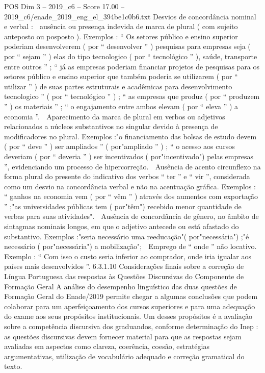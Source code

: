 \begin{textsample}{POS Dim 3 – 2019\_c6 – Score 17.00 – 2019\_c6/enade\_2019\_eng\_el\_394be1c0b6.txt}
Desvios de concordância nominal e verbal :  ausência ou presença indevida de marca de plural ( com sujeito anteposto ou posposto ).
Exemplos : “ Os setores público e ensino superior poderiam desenvolverem ( por “ desenvolver ” ) pesquisas para empresas seja ( por “ sejam ” ) elas do tipo tecnologico ( por “ tecnológico ” ), saúde, transporte entre outros ” ; “ já as empresas poderiam financiar projetos de pesquisas para os setores público e ensino superior que também poderia se utilizarem ( por “ utilizar ” ) de suas partes estruturais e acadêmicas para desenvolvimento tecnologico ” ( por “ tecnológico ” ) ; “ as empresas que produz ( por “ produzem ” ) os materiais ” ; “ o engajamento entre ambos elevam ( por “ eleva ” ) a economia ”.  Aparecimento da marca de plural em verbos ou adjetivos relacionados a núcleos substantivos no singular devido à presença de modificadores no plural.
Exemplos :"o financiamento das bolsas de estudo devem ( por “ deve ” ) ser ampliados ” ( por"ampliado ” ) ; “ o acesso aos cursos deveriam ( por “ deveria ” ) ser incentivados ( por"incentivado") pelas empresas ”, evidenciando um processo de hipercorreção.  Ausência de acento circunflexo na forma plural do presente do indicativo dos verbos “ ter ” e “ vir ”, considerada como um desvio na concordância verbal e não na acentuação gráfica.
Exemplos : “ ganhos na economia vem ( por “ vêm ” ) através dos aumentos com exportação ” ;"as universidades públicas tem ( por"têm") recebido menor quantidade de verbas para suas atividades".  Ausência de concordância de gênero, no âmbito de sintagmas nominais longos, em que o adjetivo antecede ou está afastado do substantivo.
Exemplos :"seria necessário uma reeducação"( por"necessária") ;"é necessário ( por"necessária") a mobilização";  Emprego de “ onde ” não locativo.
Exemplo : “ Com isso o custo seria inferior ao comprador, onde iria igualar aos países mais desenvolvidos ”. 6.3.1.10 Considerações finais sobre a correção de Língua Portuguesa das respostas às Questões Discursivas do Componente de Formação Geral A análise do desempenho linguístico das duas questões de Formação Geral do Enade/2019 permite chegar a algumas conclusões que podem colaborar para um aperfeiçoamento dos cursos superiores e para uma adequação do exame aos seus propósitos institucionais.
Um desses propósitos é a avaliação sobre a competência discursiva dos graduandos, conforme determinação do Inep : as questões discursivas devem fornecer material para que as respostas sejam avaliadas em aspectos como clareza, coerência, coesão, estratégias argumentativas, utilização de vocabulário adequado e correção gramatical do texto.

\end{textsample}
